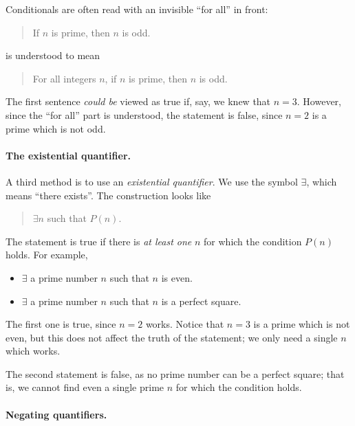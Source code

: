 \documentclass{tufte-book}
\begin{document}
Conditionals are often read with an invisible ``for all'' in front:
\begin{quote}
  If $n$ is prime, then $n$ is odd.
\end{quote}
is understood to mean
\begin{quote}
  For all integers $n$, if $n$ is prime, then $n$ is odd.
\end{quote}
The first sentence \emph{could be} viewed as true if, say, we knew that $n = 3$. However, since the ``for all'' part is understood, the statement is false, since $n = 2$ is a prime which is not odd.


\paragraph{The existential quantifier.}
\label{sec:exist-quant}

A third method is to use an \emph{existential quantifier}. We use the symbol $\exists$, which means ``there exists''. The construction looks like
\begin{quote}
  $\exists n$ such that $P(n)$. 
\end{quote}
The statement is true if there is \emph{at least one} $n$ for which the condition $P(n)$ holds. For example,
\begin{itemize}
    \item $\exists$ a prime number $n$ such that $n$ is even. 
    \item $\exists$ a prime number $n$ such that $n$ is a perfect square.
\end{itemize}
The first one is true, since $n = 2$ works. Notice that $n = 3$ is a prime which is not even, but this does not affect the truth of the statement; we only need a single $n$ which works.

The second statement is false, as no prime number can be a perfect square; that is, we cannot find even a single prime $n$ for which the condition holds.


\paragraph{Negating quantifiers.}
\label{sec:negat-quant}
\end{document}

